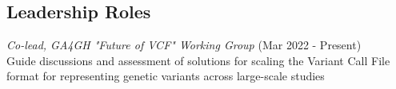 \documentclass[margin,line]{res}
\begin{document}
\begin{resume}



\section{\sc Leadership Roles}
{\em Co-lead, GA4GH "Future of VCF" Working Group} (Mar 2022 - Present)\\
Guide discussions and assessment of solutions for scaling the Variant Call File format for representing genetic variants across large-scale studies


\end{resume}
\end{document}
